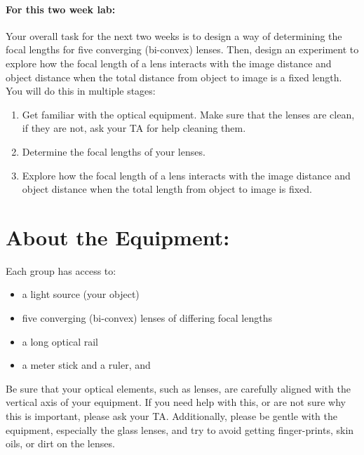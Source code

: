 \paragraph{For this two week lab:} Your overall task for the next two weeks is to design a way of determining the focal lengths for five converging (bi-convex) lenses.
Then, design an experiment to explore how the focal length of a lens interacts with the image distance and object distance when the total distance from object to image is a fixed length.
You will do this in multiple stages:
\begin{enumerate}
\itemsep-0.2em
\item Get familiar with the optical equipment. Make sure that the lenses are clean, if they are not, ask your TA for help cleaning them.
\item Determine the focal lengths of your lenses.
\item Explore how the focal length of a lens interacts with the image distance and object distance when the total length from object to image is fixed.
\end{enumerate}

\section*{About the Equipment:}
Each group has access to:
\begin{itemize}
\itemsep-0.3em
\item a light source (your object)
\item five converging (bi-convex) lenses of differing focal lengths
\item a long optical rail
\item a meter stick and a ruler, and
\end{itemize}
Be sure that your optical elements, such as lenses, are carefully aligned with the vertical axis of your equipment. 
If you need help with this, or are not sure why this is important, please ask your TA. 
Additionally, please be gentle with the equipment, especially the glass lenses, and try to avoid getting finger-prints, skin oils, or dirt on the lenses.
